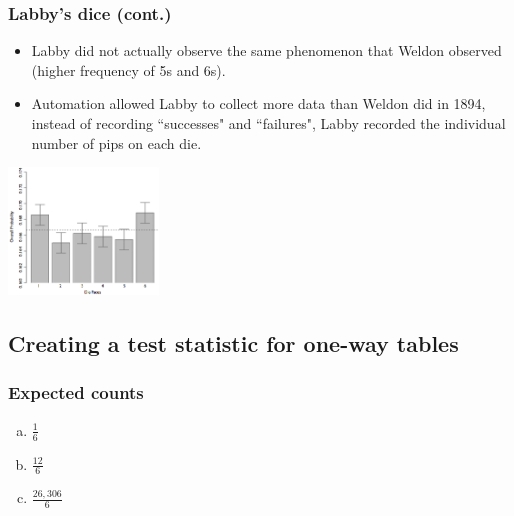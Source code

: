 \documentclass[notes,11pt, aspectratio=169]{beamer}
\begin{document}

\begin{frame}
\frametitle{Labby's dice (cont.)}

\begin{itemize}

\item Labby did not actually observe the same phenomenon that Weldon observed (higher frequency of 5s and 6s).

\item Automation allowed Labby to collect more data than Weldon did in 1894, instead of recording ``successes" and ``failures", Labby recorded the individual number of pips on each die.

\end{itemize}

\begin{center}
\includegraphics[width=0.3\textwidth]{graphs/labbyPipCounts}
\end{center}

\end{frame}


\subsection*{Creating a test statistic for one-way tables}


\begin{frame}
\frametitle{Expected counts}


\begin{enumerate}[(a)]
\item $\frac{1}{6}$
\item $\frac{12}{6}$
\item $\frac{26,306}{6}$
 
\end{enumerate}

\end{frame}
\end{document}
